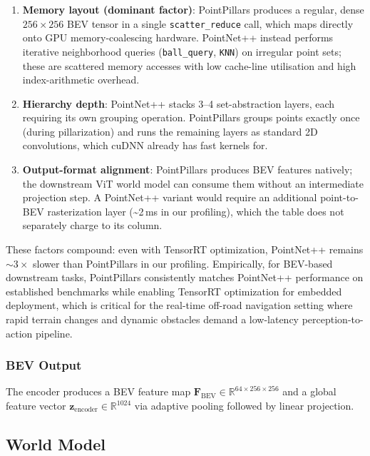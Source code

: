\documentclass[sensors,article,submit,pdftex,moreauthors]{Definitions/mdpi}
\begin{document}
\begin{enumerate}
    \item \textbf{Memory layout (dominant factor)}: PointPillars produces a regular, dense $256{\times}256$ BEV tensor in a single \texttt{scatter\_reduce} call, which maps directly onto GPU memory-coalescing hardware. PointNet++ instead performs iterative neighborhood queries (\texttt{ball\_query}, \texttt{KNN}) on irregular point sets; these are scattered memory accesses with low cache-line utilisation and high index-arithmetic overhead.
    \item \textbf{Hierarchy depth}: PointNet++ stacks 3--4 set-abstraction layers, each requiring its own grouping operation. PointPillars groups points exactly once (during pillarization) and runs the remaining layers as standard 2D convolutions, which cuDNN already has fast kernels for.
    \item \textbf{Output-format alignment}: PointPillars produces BEV features natively; the downstream ViT world model can consume them without an intermediate projection step. A PointNet++ variant would require an additional point-to-BEV rasterization layer (\textasciitilde2\,ms in our profiling), which the table does not separately charge to its column.
\end{enumerate}

These factors compound: even with TensorRT optimization, PointNet++ remains ${\sim}3\times$ slower than PointPillars in our profiling. Empirically, for BEV-based downstream tasks, PointPillars consistently matches PointNet++ performance on established benchmarks while enabling TensorRT optimization for embedded deployment, which is critical for the real-time off-road navigation setting where rapid terrain changes and dynamic obstacles demand a low-latency perception-to-action pipeline.

\subsubsection{BEV Output}
The encoder produces a BEV feature map $\mathbf{F}_\text{BEV} \in \mathbb{R}^{64 \times 256 \times 256}$ and a global feature vector $\mathbf{z}_\text{encoder} \in \mathbb{R}^{1024}$ via adaptive pooling followed by linear projection.

\subsection{World Model}
\label{sec:world_model}
\end{document}
